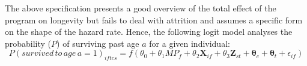 The above specification presents a good overview of the total effect of the program on longevity but fails to deal with attrition and assumes a specific form on the shape of the hazard rate. Hence, the following logit model analyses the probability ($P$) of surviving past age $a$ for a given individual:
$$
P(survived\,to\,age\,a=1)_{iftcs} = f(\theta_0 + \theta_1MP_f + \theta_2\mathbf{X}_{if} + \theta_3\mathbf{Z}_{st} + \mathbf{\theta}_c + \mathbf{\theta}_t + \epsilon_{if})
$$